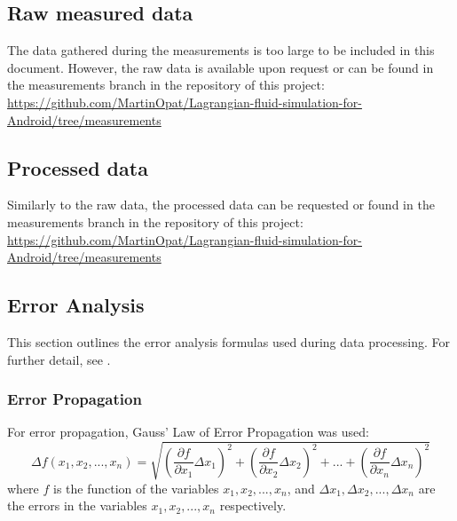 

\subsection*{Raw measured data} \label{subsection: raw measured data}
The data gathered during the measurements is too large to be included in this document. However, the raw data is available upon request or can be found in the measurements branch in the repository of this project: \url{https://github.com/MartinOpat/Lagrangian-fluid-simulation-for-Android/tree/measurements} %

\subsection*{Processed data} \label{subsection: processed data}
Similarly to the raw data, the processed data can be requested or found in the measurements branch in the repository of this project: \url{https://github.com/MartinOpat/Lagrangian-fluid-simulation-for-Android/tree/measurements}


\subsection*{Error Analysis} \label{subsection: error analysis}

This section outlines the error analysis formulas used during data processing. For further detail, see \cite{errorAnalysisBook}.
\subsubsection*{Error Propagation} \label{subsubsection: error propagation}
For error propagation, Gauss’ Law of Error Propagation was used:
\begin{equation}
    \Delta f(x_1, x_2, ..., x_n) = \sqrt{\left(\frac{\partial f}{\partial x_1}\Delta x_1\right)^2 + \left(\frac{\partial f}{\partial x_2}\Delta x_2\right)^2 + ... + \left(\frac{\partial f}{\partial x_n}\Delta x_n\right)^2}
\end{equation}
where $f$ is the function of the variables $x_1, x_2, ..., x_n$, and $\Delta x_1, \Delta x_2, ..., \Delta x_n$ are the errors in the variables $x_1, x_2, ..., x_n$ respectively.

